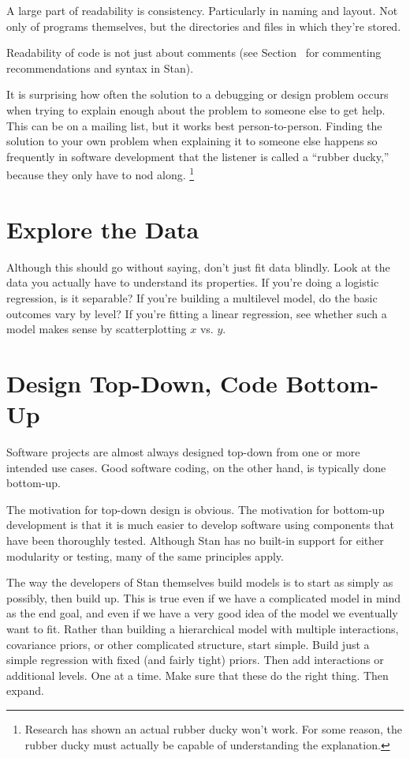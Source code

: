A large part of readability is consistency.  Particularly in naming
and layout.  Not only of programs themselves, but the directories and
files in which they're stored.

Readability of code is not just about comments (see
Section~ for commenting
recommendations and syntax in Stan).

It is surprising how often the solution to a debugging or design
problem occurs when trying to explain enough about the problem to
someone else to get help.  This can be on a mailing list, but it works
best person-to-person.  Finding the solution to your own problem when
explaining it to someone else happens so frequently in software
development that the listener is called a ``rubber ducky,'' because
they only have to nod along.%
%
\footnote{Research has shown an actual rubber ducky won't work.  For
  some reason, the rubber ducky must actually be capable of
  understanding the explanation.}


\section{Explore the Data}

Although this should go without saying, don't just fit data blindly.
Look at the data you actually have to understand its properties.  If
you're doing a logistic regression, is it separable?  If you're
building a multilevel model, do the basic outcomes vary by level?  If
you're fitting a linear regression, see whether such a model makes
sense by scatterplotting $x$ vs. $y$.

\section{Design Top-Down, Code Bottom-Up}

Software projects are almost always designed top-down from one or more
intended use cases.  Good software coding, on the other hand, is
typically done bottom-up.  

The motivation for top-down design is obvious.  The motivation for
bottom-up development is that it is much easier to develop software
using components that have been thoroughly tested.  Although Stan has
no built-in support for either modularity or testing, many of the same
principles apply.  

The way the developers of Stan themselves build models is to start as
simply as possibly, then build up. This is true even if we have a
complicated model in mind as the end goal, and even if we have a very
good idea of the model we eventually want to fit.  Rather than
building a hierarchical model with multiple interactions, covariance
priors, or other complicated structure, start simple.  Build just a
simple regression with fixed (and fairly tight) priors.  Then add
interactions or additional levels.  One at a time.  Make sure that
these do the right thing.  Then expand.

